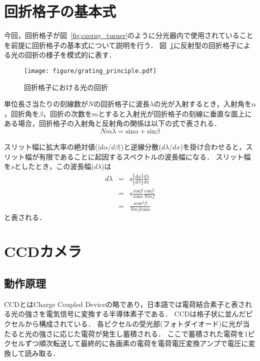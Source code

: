 \section{回折格子の基本式}
今回，回折格子が図\ \ref{fig:czerny_turner}のように分光器内で使用されていることを前提に回折格子の基本式について説明を行う．
図\ \ref{fig:grating_principle}に反射型の回折格子による光の回折の様子を模式的に表す．
\begin{figure}[htbp]
    \centering
    \texttt{[image: figure/grating\_principle.pdf]}
    \caption{回折格子における光の回折}
    \label{fig:grating_principle}
\end{figure}
単位長さ当たりの刻線数が$N$の回折格子に波長$\lambda$の光が入射するとき，入射角を$\alpha$，回折角を$\beta$，回折の次数を$m$とすると入射光が回折格子の刻線に垂直な面上にある場合，回折格子の入射角と反射角の関係は以下の式で表される．
\begin{equation}
     Nm\lambda = \mathrm{sin}{\alpha}+\mathrm{sin}{\beta}
\end{equation}

スリット幅に拡大率の絶対値($|d\alpha$/$d\beta|$)と逆線分散($d\lambda$/$dx$)を掛け合わせると，スリット幅が有限であることに起因するスペクトルの波長幅になる．
スリット幅を$s$としたとき，この波長幅($d\lambda$)は
\begin{eqnarray}
     d\lambda &=& s\left|\frac{d\alpha}{d\beta}\right|\frac{d\lambda}{dx} \nonumber \\%
        &=&s\frac{\mathrm{cos}{\beta}}{\mathrm{cos}{\alpha}}\frac{\mathrm{cos}{\beta}}{Nmf} \nonumber \\
        &=&\frac{s\mathrm{cos}^2{\beta}}{Nmf\mathrm{cos}{\alpha}}
\end{eqnarray}
と表される．

\section{CCDカメラ}
\subsection{動作原理}
CCDとはCharge Coupled Deviceの略であり，日本語では電荷結合素子と表される光の強さを電気信号に変換する半導体素子である．
CCDは格子状に並んだピクセルから構成されている．
各ピクセルの受光部(フォトダイオード)に光が当たると光の強さに応じた電荷が発生し蓄積される\cite{ccd}．
ここで蓄積された電荷を1ピクセルずつ順次転送して最終的に各画素の電荷を電荷電圧変換アンプで電圧に変換して読み取る\cite{ccd_principle}．
